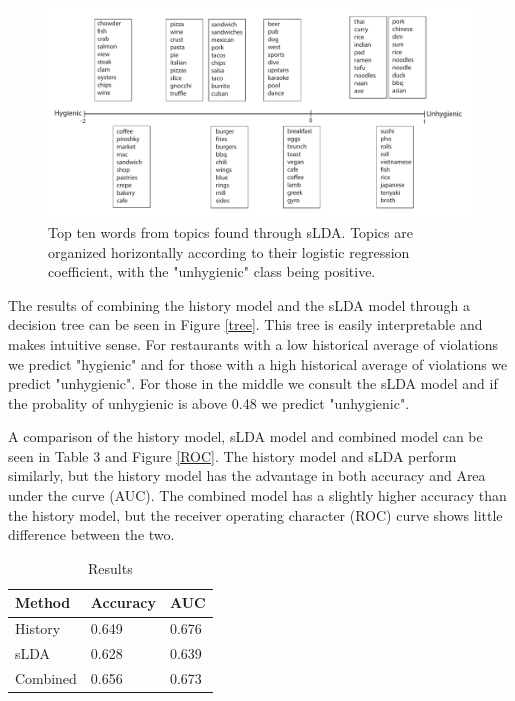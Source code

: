 \documentclass{article}
\begin{document}
\begin{figure}[h!]
\centering
\includegraphics[scale = 0.5]{topics}
\caption{Top ten words from topics found through sLDA. Topics are organized horizontally according to their logistic regression coefficient, with the "unhygienic" class being positive.}
\label{fig_topics}
\end{figure}

The results of combining the history model and the sLDA model through a decision tree can be seen in Figure \ref{tree}. This 
tree is easily interpretable and makes intuitive sense. For restaurants with a low historical average of violations we predict
"hygienic" and for those with a high historical average of violations we predict "unhygienic". For those in the middle we
consult the sLDA model and if the probality of unhygienic is above 0.48 we predict "unhygienic".

A comparison of the history model, sLDA model and combined model can be seen in Table 3 and Figure \ref{ROC}. The 
history model and sLDA perform similarly, but the history model has the advantage in both accuracy and Area under the curve 
(AUC). The combined model has a slightly higher accuracy than the history model, but the receiver operating character (ROC) 
curve shows little difference between the two.  

\begin{table}[h]
\begin{center}
\begin{tabular}{l l l}
Method   & Accuracy & AUC \\
\hline
History  & 0.649 & 0.676 \\
sLDA     & 0.628 & 0.639 \\
Combined & 0.656 & 0.673 \\
\end{tabular}
\end{center}
\label{results}
\caption{Results}
\end{table}
\end{document}
